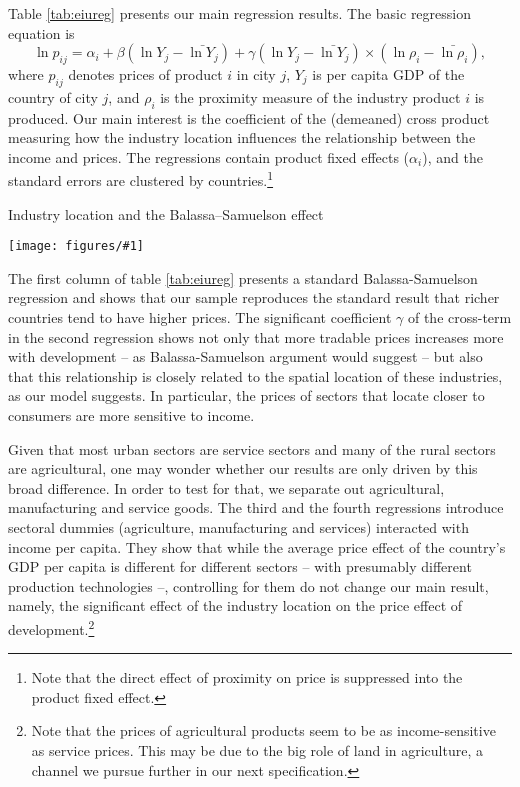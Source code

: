 \documentclass[12pt]{article}
\newcommand{\dotable}[2]{\begin{table}[h!]
\begin{centering}
\caption{#2\label{tab:#1}}
\texttt{[image: figures/\#1]}
\end{centering}
\end{table}}
\begin{document}
Table \ref{tab:eiureg} presents our main regression results. The basic regression equation is
\begin{equation*}
\ln p_{ij}=\alpha_i+\beta(\ln Y_{j}-\bar{\ln Y_j})+\gamma(\ln Y_j-\bar{\ln Y_j})\times(\ln\rho_i-\bar{\ln\rho_i}),
\end{equation*}
where $p_{ij}$ denotes prices of product $i$ in city $j$, $Y_j$ is per capita GDP of the country of city $j$, and $\rho_i$ is the proximity measure of the industry product $i$ is produced. Our main interest is the coefficient of the (demeaned) cross product measuring how the industry location influences the relationship between the income and prices. The regressions contain product fixed effects ($\alpha_i$), and the standard errors are clustered by countries.\footnote{Note that the direct effect of proximity on price is suppressed into the product fixed effect.}

\dotable{eiureg}{Industry location and the Balassa--Samuelson effect}

The first column of table \ref{tab:eiureg} presents a standard Balassa-Samuelson regression and shows that our sample reproduces the standard result that richer countries tend to have higher prices. The significant coefficient $\gamma$ of the cross-term in the second regression shows not only that more tradable prices increases more with development -- as Balassa-Samuelson argument would suggest -- but also that this relationship is closely related to the spatial location of these industries, as our model suggests. In particular, the prices of sectors that locate closer to consumers are more sensitive to income.

Given that most urban sectors are service sectors and many of the rural sectors are agricultural, one may wonder whether our results are only driven by this broad difference. In order to test for that, we separate out agricultural, manufacturing and service goods. The third and the fourth regressions introduce sectoral dummies (agriculture, manufacturing and services) interacted with income per capita. They show that while the average price effect of the country's GDP per capita is different for different sectors -- with presumably different production technologies --, controlling for them do not change our main result, namely, the significant effect of the industry location on the price effect of development.\footnote{Note that the prices of agricultural products seem to be as income-sensitive as service prices. This may be due to the big role of land in agriculture, a channel we pursue further in our next specification.}
\end{document}
